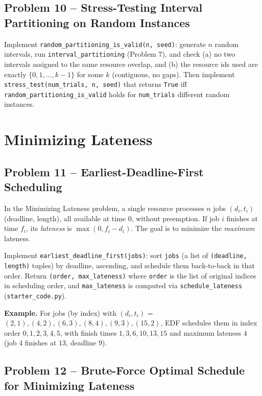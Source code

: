 \documentclass[11pt]{article}
\begin{document}
\subsection*{Problem 10 -- Stress-Testing Interval Partitioning on Random Instances}

Implement \texttt{random\_partitioning\_is\_valid(n, seed)}: generate $n$ random
intervals, run \texttt{interval\_partitioning} (Problem 7), and check (a) no two
intervals assigned to the same resource overlap, and (b) the resource ids used are
exactly $\{0, 1, \ldots, k-1\}$ for some $k$ (contiguous, no gaps). Then implement
\texttt{stress\_test(num\_trials, n, seed)} that returns \texttt{True} iff
\texttt{random\_partitioning\_is\_valid} holds for \texttt{num\_trials} different random
instances.

\newpage
\section{Minimizing Lateness}

\subsection*{Problem 11 -- Earliest-Deadline-First Scheduling}

In the Minimizing Lateness problem, a single resource processes $n$ jobs
$(d_i, t_i)$ (deadline, length), all available at time 0, without preemption. If job $i$
finishes at time $f_i$, its \emph{lateness} is $\max(0, f_i - d_i)$. The goal is to
minimize the \emph{maximum} lateness.

Implement \texttt{earliest\_deadline\_first(jobs)}: sort \texttt{jobs} (a list of
\texttt{(deadline, length)} tuples) by deadline, ascending, and schedule them back-to-back
in that order. Return \texttt{(order, max\_lateness)} where \texttt{order} is the list of
original indices in scheduling order, and \texttt{max\_lateness} is computed via
\texttt{schedule\_lateness} (\texttt{starter\_code.py}).

\textbf{Example.} For jobs (by index) with $(d_i,t_i)$ = $(2,1), (4,2), (6,3), (8,4),
(9,3), (15,2)$, EDF schedules them in index order $0,1,2,3,4,5$, with finish times
$1,3,6,10,13,15$ and maximum lateness $4$ (job 4 finishes at $13$, deadline $9$).

\subsection*{Problem 12 -- Brute-Force Optimal Schedule for Minimizing Lateness}
\end{document}
